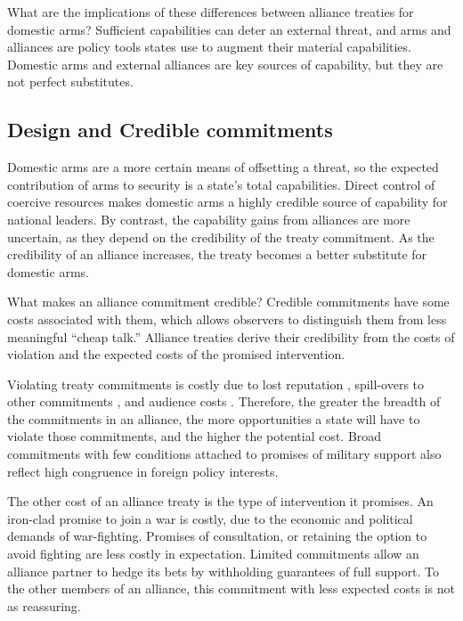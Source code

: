 \documentclass[12pt]{article}
\begin{document}
What are the implications of these differences between alliance treaties for domestic arms? Sufficient capabilities can deter an external threat, and arms and alliances are policy tools states use to augment their material capabilities. Domestic arms and external alliances are key sources of capability, but they are not perfect substitutes. 



\subsection*{Design and Credible commitments}

Domestic arms are a more certain means of offsetting a threat, so the expected contribution of arms to security is a state's total capabilities. Direct control of coercive resources makes domestic arms a highly credible source of capability for national leaders. By contrast, the capability gains from alliances are more uncertain, as they depend on the credibility of the treaty commitment. As the credibility of an alliance increases, the treaty becomes a better substitute for domestic arms. 

What makes an alliance commitment credible? Credible commitments have some costs associated with them, which allows observers to distinguish them from less meaningful ``cheap talk.'' Alliance treaties derive their credibility from the costs of violation and the expected costs of the promised intervention. 

Violating treaty commitments is costly due to lost reputation \citep{Gibler2008}, spill-overs to other commitments\citep{Crescenzi2012} , and audience costs \citep{Fearon1997, Tomz2007ar, Chibaetal2015, Levyetal2015}. Therefore, the greater the breadth of the commitments in an alliance, the more opportunities a state will have to violate those commitments, and the higher the potential cost. Broad commitments with few conditions attached to promises of military support also reflect high congruence in foreign policy interests. 

The other cost of an alliance treaty is the type of intervention it promises. An iron-clad promise to join a war is costly, due to the economic and political demands of war-fighting. Promises of consultation, or retaining the option to avoid fighting are less costly in expectation. Limited commitments allow an alliance partner to hedge its bets by withholding guarantees of full support. To the other members of an alliance, this commitment with less expected costs is not as reassuring. 
\end{document}
